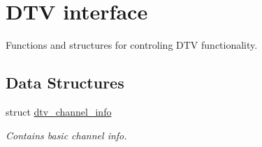 \hypertarget{group__dtv}{}\section{D\+TV interface}
\label{group__dtv}


Functions and structures for controling D\+TV functionality.  


\subsection*{Data Structures}
\begin{DoxyCompactItemize}
\item 
struct \hyperlink{structdtv__channel__info}{dtv\+\_\+channel\+\_\+info}
\begin{DoxyCompactList}\small\item\em Contains basic channel info. \end{DoxyCompactList}\end{DoxyCompactItemize}
